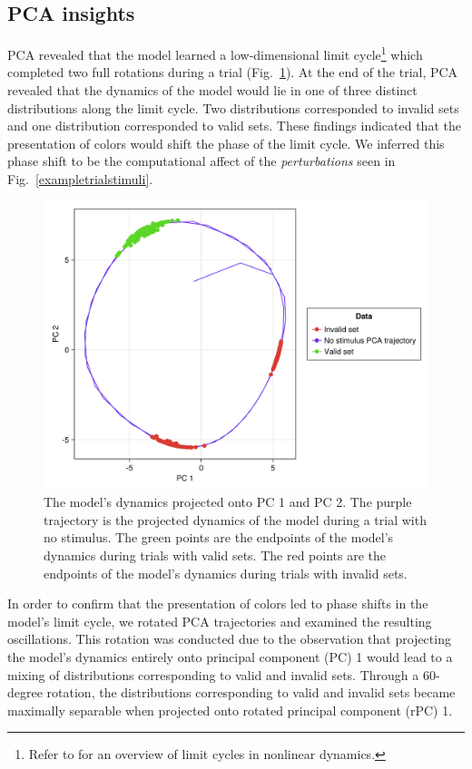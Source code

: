 \documentclass[conference]{IEEEtran}
\begin{document}
\subsection{PCA insights}

PCA revealed that the model learned a low-dimensional limit cycle\footnote{Refer to \cite{strogatz2018nonlinear} for an overview of limit cycles in nonlinear dynamics.} which completed two full rotations during a trial (Fig.~\ref{pcasummary}). At the end of the trial, PCA revealed that the dynamics of the model would lie in one of three distinct distributions along the limit cycle. Two distributions corresponded to invalid sets and one distribution corresponded to valid sets. These findings indicated that the presentation of colors would shift the phase of the limit cycle. We inferred this phase shift to be the computational affect of the \textit{perturbations} seen in Fig.~\ref{exampletrialstimuli}.

\begin{figure}[htbp]
\centerline{\includegraphics[scale=0.10]{pca_summary.png}}
\caption{The model's dynamics projected onto PC 1 and PC 2. The purple trajectory is the projected dynamics of the model during a trial with no stimulus. The green points are the endpoints of the model’s dynamics during trials with valid sets. The red points are the endpoints of the model’s dynamics during trials with invalid sets.}
\label{pcasummary}
\end{figure}

In order to confirm that the presentation of colors led to phase shifts in the model's limit cycle, we rotated PCA trajectories and examined the resulting oscillations. This rotation was conducted due to the observation that projecting the model's dynamics entirely onto principal component (PC) 1 would lead to a mixing of distributions corresponding to valid and invalid sets. Through a $60$-degree rotation, the distributions corresponding to valid and invalid sets became maximally separable when projected onto rotated principal component (rPC) 1.
\end{document}
